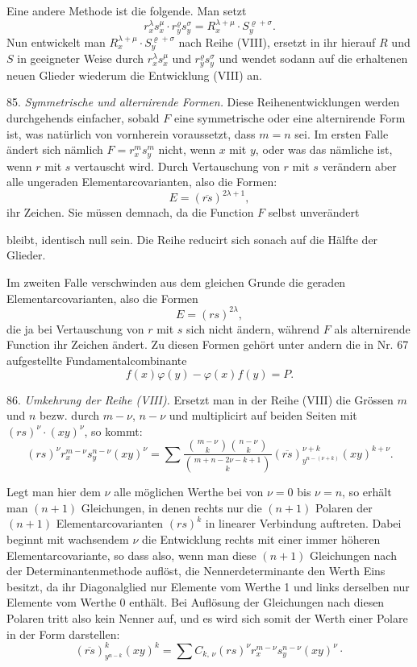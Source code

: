 \documentclass[11pt]{article}
\providecommand{\weberpage}[1]{}
\providecommand{\weq}[2]{\begin{equation}\tag{#1}#2\end{equation}}
\begin{document}
Eine andere Methode ist die folgende. Man setzt
\[
r_x^\lambda s_x^\mu\cdot r_y^\varrho s_y^\sigma=R_x^{\lambda+\mu}\cdot S_y^{\varrho+\sigma}.
\]
Nun entwickelt man $R_x^{\lambda+\mu}\cdot S_y^{\varrho+\sigma}$ nach Reihe (VIII), ersetzt in ihr hierauf $R$ und $S$ in geeigneter Weise durch $r_x^\lambda s_x^\mu$ und $r_y^\varrho s_y^\sigma$ und wendet sodann auf die erhaltenen neuen Glieder wiederum die Entwicklung (VIII) an.

85. \textit{Symmetrische und alternirende Formen.} Diese Reihenentwicklungen werden durchgehends einfacher, sobald $F$ eine symmetrische oder eine alternirende Form ist, was natürlich von vornherein voraussetzt, dass $m=n$ sei. Im ersten Falle ändert sich nämlich $F=r_x^m s_y^m$ nicht, wenn $x$ mit $y$, oder was das nämliche ist, wenn $r$ mit $s$ vertauscht wird. Durch Vertauschung von $r$ mit $s$ verändern aber alle ungeraden Elementarcovarianten, also die Formen:
\[
E=(\overline{rs})^{2\lambda+1},
\]
ihr Zeichen. Sie müssen demnach, da die Function $F$ selbst unverändert


\weberpage{89}
bleibt, identisch null sein. Die Reihe reducirt sich sonach auf die H\"alfte der Glieder.

Im zweiten Falle verschwinden aus dem gleichen Grunde die geraden Elementarcovarianten, also die Formen
\[
E = (rs)^{2\lambda},
\]
die ja bei Vertauschung von $r$ mit $s$ sich nicht \"andern, w\"ahrend $F$ als alternirende Function ihr Zeichen \"andert. Zu diesen Formen geh\"ort unter andern die in Nr. 67 aufgestellte Fundamentalcombinante
\[
f(x)\varphi(y) - \varphi(x)f(y) = P.
\]

86. \textit{Umkehrung der Reihe (VIII).} Ersetzt man in der Reihe (VIII) die Gr\"ossen $m$ und $n$ bezw. durch $m-\nu$, $n-\nu$ und multiplicirt auf beiden Seiten mit $(rs)^\nu \cdot (xy)^\nu$, so kommt:
\[
(rs)^\nu r_x^{m-\nu} s_y^{n-\nu} (xy)^\nu = \sum \frac{\binom{m-\nu}{k}\binom{n-\nu}{k}}{\binom{m+n-2\nu-k+1}{k}} (\overline{rs})_{y^{n-(\nu+k)}}^{\nu+k} (xy)^{k+\nu}. %
\]

Legt man hier dem $\nu$ alle m\"oglichen Werthe bei von $\nu = 0$ bis $\nu = n$, so erh\"alt man $(n+1)$ Gleichungen, in denen rechts nur die $(n+1)$ Polaren der $(n+1)$ Elementarcovarianten $(rs)^k$ in linearer Verbindung auftreten. Dabei beginnt mit wachsendem $\nu$ die Entwicklung rechts mit einer immer h\"oheren Elementarcovariante, so dass also, wenn man diese $(n+1)$ Gleichungen nach der Determinantenmethode aufl\"ost, die Nennerdeterminante den Werth Eins besitzt, da ihr Diagonalglied nur Elemente vom Werthe 1 und links derselben nur Elemente vom Werthe 0 enth\"alt. Bei Aufl\"osung der Gleichungen nach diesen Polaren tritt also kein Nenner auf, und es wird sich somit der Werth einer Polare in der Form darstellen:
\weq{1}{(\overline{rs})^k_{y^{n-k}} (xy)^k = \sum C_{k,\,\nu} (rs)^\nu r_x^{m-\nu} s_y^{n-\nu} (xy)^\nu \cdot}
\end{document}
